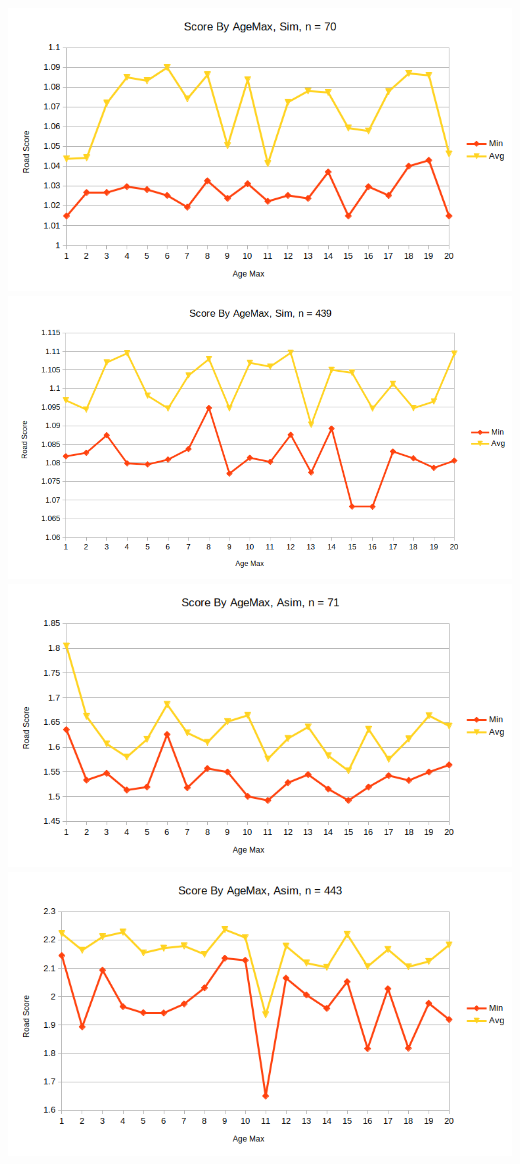 \documentclass{article}
\begin{document}
\includegraphics[scale=0.36]{ageSim70}
\includegraphics[scale=0.36]{ageSim439}
\includegraphics[scale=0.36]{ageAsim71}
\includegraphics[scale=0.36]{ageAsim443}
\end{document}
